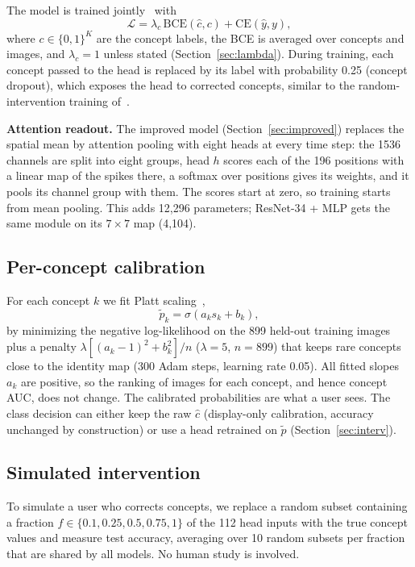 \documentclass[conference]{IEEEtran}
\begin{document}
The model is trained jointly~\cite{koh2020concept} with
\begin{equation}
\mathcal{L}=\lambda_c\,\mathrm{BCE}(\hat c, c)+\mathrm{CE}(\hat y, y),
\label{eq:loss}
\end{equation}
where $c\in\{0,1\}^K$ are the concept labels, the BCE is averaged over concepts and images, and $\lambda_c=1$ unless stated (Section~\ref{sec:lambda}). During training, each concept passed to the head is replaced by its label with probability 0.25 (concept dropout), which exposes the head to corrected concepts, similar to the random-intervention training of~\cite{espinosa2022concept}.

\textbf{Attention readout.} The improved model (Section~\ref{sec:improved}) replaces the spatial mean by attention pooling with eight heads at every time step: the 1536 channels are split into eight groups, head $h$ scores each of the 196 positions with a linear map of the spikes there, a softmax over positions gives its weights, and it pools its channel group with them. The scores start at zero, so training starts from mean pooling. This adds 12,296 parameters; ResNet-34 + MLP gets the same module on its $7\times7$ map (4,104).

\subsection{Per-concept calibration}
For each concept $k$ we fit Platt scaling~\cite{platt1999probabilistic},
\begin{equation}
\tilde p_k=\sigma(a_k s_k + b_k),
\label{eq:platt}
\end{equation}
by minimizing the negative log-likelihood on the 899 held-out training images plus a penalty $\lambda[(a_k-1)^2+b_k^2]/n$ ($\lambda=5$, $n=899$) that keeps rare concepts close to the identity map (300 Adam steps, learning rate 0.05). All fitted slopes $a_k$ are positive, so the ranking of images for each concept, and hence concept AUC, does not change. The calibrated probabilities are what a user sees. The class decision can either keep the raw $\hat c$ (display-only calibration, accuracy unchanged by construction) or use a head retrained on $\tilde p$ (Section~\ref{sec:interv}).

\subsection{Simulated intervention}
To simulate a user who corrects concepts, we replace a random subset containing a fraction $f\in\{0.1,0.25,0.5,0.75,1\}$ of the 112 head inputs with the true concept values and measure test accuracy, averaging over 10 random subsets per fraction that are shared by all models. No human study is involved.
\end{document}
